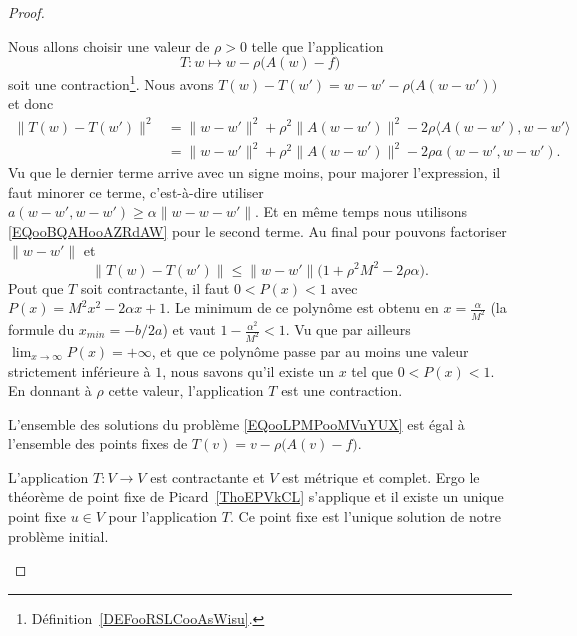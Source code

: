 \begin{proof}
\begin{subproof}
		Nous allons choisir une valeur de \( \rho>0\) telle que l'application
		\begin{equation}
			T\colon w\mapsto w-\rho\big( A(w)-f \big)
		\end{equation}
		soit une contraction\footnote{Définition~\ref{DEFooRSLCooAsWisu}.}. Nous avons \( T(w)-T(w')=w-w'-\rho\big( A(w-w') \big)\) et donc
		\begin{subequations}
			\begin{align}
				\| T(w)-T(w') \|^2 & =\| w-w' \|^2+\rho^2\| A(w-w') \|^2-2\rho\langle A(w-w'), w-w'\rangle \\
				                   & =\| w-w' \|^2+\rho^2\| A(w-w') \|^2-2\rho a(w-w',w-w').
			\end{align}
		\end{subequations}
		Vu que le dernier terme arrive avec un signe moins, pour majorer l'expression, il faut minorer ce terme, c'est-à-dire utiliser \( a(w-w',w-w')\geq \alpha\| w-w-w' \|\). Et en même temps nous utilisons \eqref{EQooBQAHooAZRdAW} pour le second terme. Au final pour pouvons factoriser \( \| w-w' \|\) et
		\begin{equation}
			\| T(w)-T(w') \|\leq \| w-w' \|\big( 1+\rho^2M^2-2\rho\alpha \big).
		\end{equation}
		Pout que \( T\) soit contractante, il faut \( 0<P(x)<1\) avec \( P(x)=M^2x^2-2\alpha x+1\). Le minimum de ce polynôme est obtenu en \( x=\frac{ \alpha }{ M^2 }\) (la formule du \( x_{min}=-b/2a\)) et vaut \( 1-\frac{ \alpha^2 }{ M^2 }<1\). Vu que par ailleurs \( \lim_{x\to \infty} P(x)=+\infty\), et que ce polynôme passe par au moins une valeur strictement inférieure à \( 1\), nous savons qu'il existe un \( x\) tel que \( 0<P(x)<1\). En donnant à \( \rho\) cette valeur, l'application \( T\) est une contraction.

		L'ensemble des solutions du problème \eqref{EQooLPMPooMVuYUX} est égal à l'ensemble des points fixes de \( T(v)=v-\rho\big( A(v)-f \big)\).

		L'application \( T\colon V\to V\) est contractante et \( V\) est métrique et complet. Ergo le théorème de point fixe de Picard~\ref{ThoEPVkCL} s'applique et il existe un unique point fixe \( u\in V\) pour l'application \( T\). Ce point fixe est l'unique solution de notre problème initial.

		\spitem[La majoration]


\end{subproof}
\end{proof}
